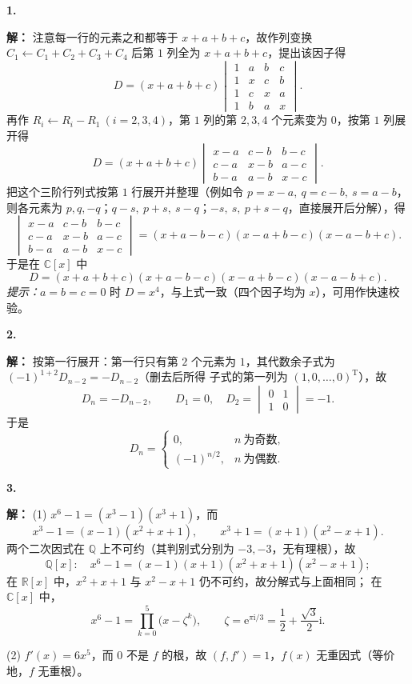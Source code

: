 \documentclass[11pt,a4paper,fontset=windows]{ctexart}
\newcommand{\sola}[2]{\Needspace{4\baselineskip}\par\vspace{10pt}%
  \noindent\textbf{#1}\hspace{0.45em}{\small\color{hdgray}\songti #2}\par\vspace{1pt}}
\newcommand{\sd}{\textbf{解：}}
\begin{document}
\sola{1.}{（10 分）}\sd
注意每一行的元素之和都等于 $x+a+b+c$，故作列变换 $C_1\leftarrow C_1+C_2+C_3+C_4$ 后第 $1$ 列全为
$x+a+b+c$，提出该因子得
\[
D=(x+a+b+c)\begin{vmatrix}
1&a&b&c\\
1&x&c&b\\
1&c&x&a\\
1&b&a&x
\end{vmatrix}.
\]
再作 $R_i\leftarrow R_i-R_1\ (i=2,3,4)$，第 $1$ 列的第 $2,3,4$ 个元素变为 $0$，按第 $1$ 列展开得
\[
D=(x+a+b+c)\begin{vmatrix}
x-a&c-b&b-c\\
c-a&x-b&a-c\\
b-a&a-b&x-c
\end{vmatrix}.
\]
把这个三阶行列式按第 $1$ 行展开并整理（例如令 $p=x-a,\ q=c-b,\ s=a-b$，则各元素为
$p,q,-q$；$q-s,\ p+s,\ s-q$；$-s,\ s,\ p+s-q$，直接展开后分解），得
\[
\begin{vmatrix}
x-a&c-b&b-c\\
c-a&x-b&a-c\\
b-a&a-b&x-c
\end{vmatrix}
=(x+a-b-c)(x-a+b-c)(x-a-b+c).
\]
于是在 $\mathbb{C}[x]$ 中
\[
D=(x+a+b+c)(x+a-b-c)(x-a+b-c)(x-a-b+c).
\]
\emph{提示：}$a=b=c=0$ 时 $D=x^{4}$，与上式一致（四个因子均为 $x$），可用作快速校验。

\sola{2.}{（10 分）}\sd
按第一行展开：第一行只有第 $2$ 个元素为 $1$，其代数余子式为 $(-1)^{1+2}D_{n-2}=-D_{n-2}$（删去后所得
子式的第一列为 $(1,0,\dots,0)^{\mathrm T}$），故
\[
D_n=-D_{n-2},\qquad D_1=0,\quad D_2=\begin{vmatrix}0&1\\1&0\end{vmatrix}=-1 .
\]
于是
\[
D_n=\begin{cases}
0, & n\ \text{为奇数},\\[4pt]
(-1)^{n/2}, & n\ \text{为偶数}.
\end{cases}
\]

\sola{3.}{（10 分）}\sd
(1) $x^{6}-1=(x^{3}-1)(x^{3}+1)$，而
\[
x^{3}-1=(x-1)(x^{2}+x+1),\qquad x^{3}+1=(x+1)(x^{2}-x+1).
\]
两个二次因式在 $\mathbb{Q}$ 上不可约（其判别式分别为 $-3,-3$，无有理根），故
\[
\mathbb{Q}[x]:\quad x^{6}-1=(x-1)(x+1)(x^{2}+x+1)(x^{2}-x+1);
\]
在 $\mathbb{R}[x]$ 中，$x^{2}+x+1$ 与 $x^{2}-x+1$ 仍不可约，故分解式与上面相同；
在 $\mathbb{C}[x]$ 中，
\[
x^{6}-1=\prod_{k=0}^{5}\bigl(x-\zeta^{k}\bigr),\qquad \zeta=\mathrm{e}^{\pi\mathrm{i}/3}=\frac12+\frac{\sqrt3}{2}\mathrm{i}.
\]
\par
(2) $f'(x)=6x^{5}$，而 $0$ 不是 $f$ 的根，故 $(f,f')=1$，$f(x)$ 无重因式（等价地，$f$ 无重根）。
\end{document}
